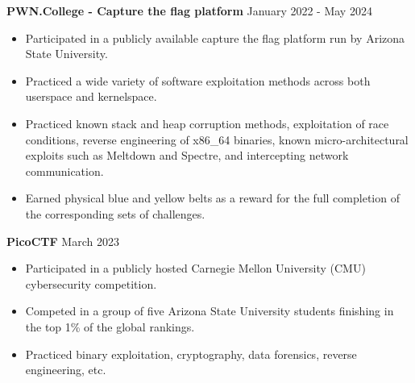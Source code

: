 \textbf{PWN.College - Capture the flag platform} \hfill January 2022 - May 2024
\begin{itemize}
    \item Participated in a publicly available capture the flag platform run by Arizona State University.
    \item Practiced a wide variety of software exploitation methods across both userspace and kernelspace.
    \item Practiced known stack and heap corruption methods, exploitation of race conditions, reverse engineering of x86\_64 binaries, known micro-architectural exploits such as Meltdown and Spectre, and intercepting network communication.
    \item Earned physical blue and yellow belts as a reward for the full completion of the corresponding sets of challenges.
\end{itemize}

\textbf{PicoCTF} \hfill March 2023
\begin{itemize}
    \item Participated in a publicly hosted Carnegie Mellon University (CMU) cybersecurity competition.
    \item Competed in a group of five Arizona State University students finishing in the top 1\% of the global rankings.
    \item Practiced binary exploitation, cryptography, data forensics, reverse engineering, etc.
\end{itemize}
